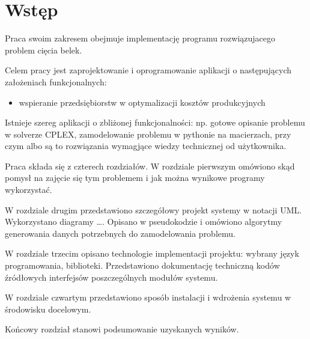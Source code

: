\chapter*{Wstęp}

\thispagestyle{chapterBeginStyle}



Praca swoim zakresem obejmuje implementację programu rozwiązujacego problem cięcia belek.

Celem pracy jest zaprojektowanie i oprogramowanie aplikacji o następujących założeniach funkcjonalnych:
\begin{itemize}
    \item wspieranie przedsiębiorstw w optymalizacji kosztów produkcyjnych
\end{itemize}

Istnieje szereg aplikacji o zbliżonej funkcjonalności: np. gotowe opisanie problemu w solverze CPLEX, zamodelowanie problemu w pythonie na macierzach, przy czym albo są to rozwiązania wymagjące wiedzy technicznej od użytkownika.

Praca składa się z czterech rozdziałów.
W rozdziale pierwszym omówiono skąd pomysł na zajęcie się tym problemem i jak można wynikowe programy wykorzystać.

{\color{dgray}
W rozdziale drugim przedstawiono szczegółowy projekt systemy w notacji UML. Wykorzystano diagramy \ldots.
Opisano w pseudokodzie i omówiono algorytmy generowania danych potrzebnych do zamodelowania problemu.

W rozdziale trzecim opisano technologie implementacji projektu: wybrany język programowania, biblioteki. Przedstawiono dokumentację techniczną kodów źródłowych interfejsów poszczególnych modułów systemu.

W rozdziale czwartym przedstawiono sposób instalacji i wdrożenia systemu w środowisku docelowym.

Końcowy rozdział stanowi podsumowanie uzyskanych wyników.
}

